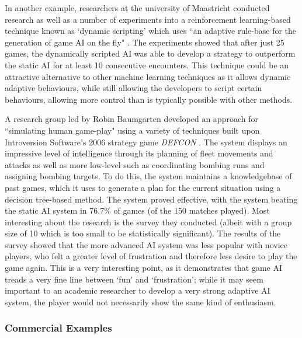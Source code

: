 \documentclass[a4paper,oneside]{report}
\begin{document}
In another example, researchers at the university of Maastricht conducted research as well as a number of experiments into a reinforcement learning-based technique known as `dynamic scripting' which uses ``an adaptive rule-base for the generation of game AI on the fly" \cite{Spronck:2005fu}. The experiments showed that after just 25 games, the dynamically scripted AI was able to develop a strategy to outperform the static AI for at least 10 consecutive encounters. This technique could be an attractive alternative to other machine learning techniques as it allows dynamic adaptive behaviours, while still allowing the developers to script certain behaviours, allowing more control than is typically possible with other methods.

A research group led by Robin Baumgarten developed an approach for ``simulating human game-play" using a variety of techniques built upon Introversion Software's 2006 strategy game \emph{DEFCON} \cite{Baumgarten:2008il}. The system displays an impressive level of intelligence through its planning of fleet movements and attacks as well as more low-level such as coordinating bombing runs and assigning bombing targets. To do this, the system maintains a knowledgebase of past games, which it uses to generate a plan for the current situation using a decision tree-based method. The system proved effective, with the system beating the static AI system in 76.7\% of games (of the 150 matches played). Most interesting about the research is the survey they conducted (albeit with a group size of 10 which is too small to be statistically significant). The results of the survey showed that the more advanced AI system was less popular with novice players, who felt a greater level of frustration and therefore less desire to play the game again. This is a very interesting point, as it demonstrates that game AI treads a very fine line between `fun' and `frustration'; while it may seem important to an academic researcher to develop a very strong adaptive AI system, the player would not necessarily show the same kind of enthusiasm.

\subsubsection{Commercial Examples}
\end{document}
